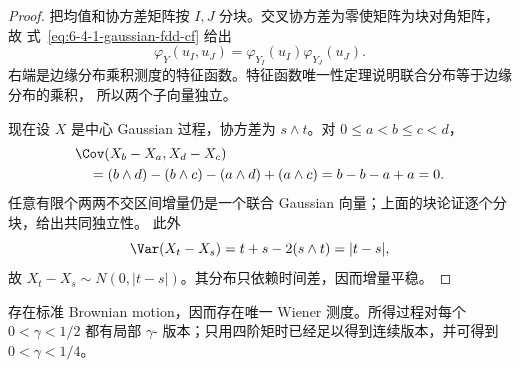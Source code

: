 \begin{proof}
把均值和协方差矩阵按 $I,J$ 分块。交叉协方差为零使矩阵为块对角矩阵，故
式~\eqref{eq:6-4-1-gaussian-fdd-cf} 给出
\[
 \varphi_Y(u_I,u_J)
 =\varphi_{Y_I}(u_I)\varphi_{Y_J}(u_J).
\]
右端是边缘分布乘积测度的特征函数。特征函数唯一性定理说明联合分布等于边缘分布的乘积，
所以两个子向量独立。

现在设 $X$ 是中心 Gaussian 过程，协方差为 $s\wedge t$。对 $0\le a<b\le c<d$，
\begin{align*}
 &\Cov(X_b-X_a,X_d-X_c)\\
 &\quad=(b\wedge d)-(b\wedge c)-(a\wedge d)+(a\wedge c)
 =b-b-a+a=0.
\end{align*}
任意有限个两两不交区间增量仍是一个联合 Gaussian 向量；上面的块论证逐个分块，给出共同独立性。
此外
\[
 \Var(X_t-X_s)=t+s-2(s\wedge t)=|t-s|,
\]
故 $X_t-X_s\sim N(0,|t-s|)$。其分布只依赖时间差，因而增量平稳。
\end{proof}

\begin{theorem}\label{theorem:6-4-1-1}
存在标准 Brownian motion，因而存在唯一 Wiener 测度。所得过程对每个
$0<\gamma<1/2$ 都有局部 $\gamma$-\Holder{} 版本；只用四阶矩时已经足以得到连续版本，并可得到
$0<\gamma<1/4$。
\end{theorem}

